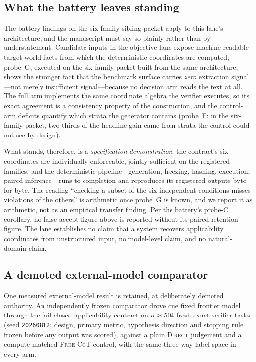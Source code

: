 \subsection{What the battery leaves standing}

The battery findings on the six-family sibling packet apply to this lane's architecture, and the manuscript must say so plainly rather than by understatement. Candidate inputs in the objective lane expose machine-readable target-world facts from which the deterministic coordinates are computed; probe~G, executed on the six-family packet built from the same architecture, shows the stronger fact that the benchmark surface carries \emph{zero} extraction signal---not merely insufficient signal---because no decision arm reads the text at all. The full arm implements the same coordinate algebra the verifier executes, so its exact agreement is a consistency property of the construction, and the control-arm deficits quantify which strata the generator contains (probe~F: in the six-family packet, two thirds of the headline gain came from strata the control could not see by design).

What stands, therefore, is a \emph{specification demonstration}: the contract's six coordinates are individually enforceable, jointly sufficient on the registered families, and the deterministic pipeline---generation, freezing, hashing, execution, paired inference---runs to completion and reproduces its registered outputs byte-for-byte. The reading ``checking a subset of the six independent conditions misses violations of the others'' is arithmetic once probe~G is known, and we report it as arithmetic, not as an empirical transfer finding. Per the battery's probe-C corollary, no false-accept figure above is reported without its paired retention figure. The lane establishes no claim that a system recovers applicability coordinates from unstructured input, no model-level claim, and no natural-domain claim.

\subsection{A demoted external-model comparator}
\label{sec:llm-comparator}

One measured external-model result is retained, at deliberately demoted authority. An independently frozen comparator drove one fixed frontier model through the fail-closed applicability contract on $n\approx504$ fresh exact-verifier tasks (seed \texttt{20260812}; design, primary metric, hypothesis direction and stopping rule frozen before any output was scored), against a plain \textsc{Direct} judgement and a compute-matched \textsc{Free-CoT} control, with the same three-way label space in every arm.

